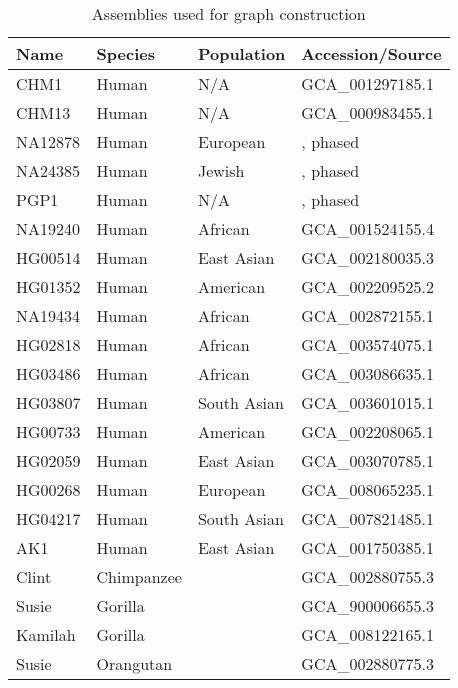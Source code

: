 \documentclass[twocolumn]{bmcart}
\begin{document}
\begin{table}[tb]
\caption{Assemblies used for graph construction}\label{tab:asm}
\begin{tabular}{llll}
\hline
Name & Species & Population  & Accession/Source \\ \hline
CHM1 & Human   & N/A         & GCA\_001297185.1 \\
CHM13 & Human  & N/A         & GCA\_000983455.1 \\
NA12878 & Human & European   & \cite{Garg810341}, phased \\
NA24385 & Human & Jewish     & \cite{Garg810341}, phased \\
PGP1 & Human & N/A           & \cite{Garg810341}, phased \\
NA19240 & Human & African    & GCA\_001524155.4 \\
HG00514 & Human & East Asian & GCA\_002180035.3 \\
HG01352 & Human & American   & GCA\_002209525.2 \\
NA19434 & Human & African    & GCA\_002872155.1 \\
HG02818 & Human & African    & GCA\_003574075.1 \\
HG03486 & Human & African    & GCA\_003086635.1 \\
HG03807 & Human & South Asian& GCA\_003601015.1 \\
HG00733 & Human & American   & GCA\_002208065.1 \\
HG02059 & Human & East Asian & GCA\_003070785.1 \\
HG00268 & Human & European   & GCA\_008065235.1 \\
HG04217 & Human & South Asian& GCA\_007821485.1 \\
AK1     & Human & East Asian & GCA\_001750385.1 \\
Clint   & Chimpanzee &       & GCA\_002880755.3 \\
Susie   & Gorilla &          & GCA\_900006655.3 \\
Kamilah & Gorilla &          & GCA\_008122165.1 \\
Susie   & Orangutan &        & GCA\_002880775.3 \\
\hline
\end{tabular}
\end{table}
\end{document}
